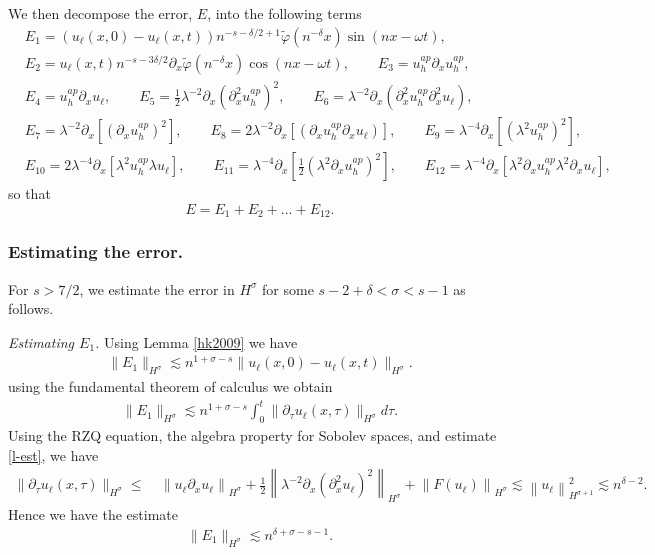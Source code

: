 \documentclass[reqno]{amsart}
\theoremstyle{plain}
\numberwithin{equation}{section}
\begin{document}
We then decompose the error, $E$, into the following terms  
\begin{align*}
 &E_1 = (u_\ell(x,0) - u_\ell(x,t) ) n^{-s-\delta/2 +1 } \widetilde \varphi(n^{-\delta } x) \sin(nx-\omega t)   ,
\\
  &E_2 = u_\ell(x,t) n^{-s-3\delta/2}  \partial_x \widetilde \varphi (n^{-\delta }x) \cos(nx-\omega t)  ,
 \quad \quad E_3 =  u_h^{ap} \partial_x  u_h^{ap}   ,
  \\
 & 
 E_4 = u_h^{ap} \partial_x u_\ell  ,
\quad \quad 
E_5 =  \frac12 \lambda^{-2} \partial_x ( \partial_x ^2 u_h^{ap} )^2 ,
 \quad \quad  
 E_6 =  \lambda^{-2} \partial_x ( \partial_x ^2 u_h^{ap} \partial_x ^2 u_\ell ) ,
\\ &
E_7 = \lambda^{-2}  \partial_x \left [(\partial_x u_h ^{ap}  )^2   \right ] ,
\quad \quad  
E_8 = 2 \lambda^{-2}  \partial_x \left [(\partial_x u_h ^{ap} \partial_x u_\ell )    \right ]  ,
\quad \quad   E_9 =   \lambda^{-4} \partial_x \left [  ( \lambda ^2   u_h ^{ap}  )^2    \right ] ,
\\ & 
E_{10}=  2 \lambda^{-4} \partial_x \left [  \lambda  ^2  u_h ^{ap}   \lambda    u_\ell   \right ]  ,
\quad \quad E_{11} = \lambda^{-4} \partial_x  \left [  \frac12  \left (\lambda^2  \partial_ x u_h^{ap}   \right)^2  \right ]  ,
\quad \quad E_{12} = \lambda^{-4} \partial_x  \left [    \lambda ^2 \partial_ x u_h^{ap}  \lambda ^2\partial_ x u_\ell     \right ]  ,
\end{align*}
 so that $$
 E = E_1+E_2+\dots + E_{12} . 
 $$
 
 \subsubsection{Estimating the error.} For $s>7/2$, we estimate the error in $H^\sigma$ for some $s-2+\delta <\sigma < s-1$ as follows. 
 
 {\em Estimating $E_1$.} Using Lemma \ref{hk2009} we have 
 \begin{align}
 \| E_1 \|_{H^\sigma} \lesssim  n^{1+\sigma - s} \| u_\ell(x,0) - u_\ell(x,t)\|_{H^\sigma} .
 \end{align}
 using the fundamental theorem of calculus we obtain 
 \begin{align}
 \| E_1 \|_{H^\sigma} \lesssim  n^{1+\sigma - s} \int_0^t \| \partial_\tau u_\ell(x,\tau)  \|_{H^\sigma} d\tau.
 \end{align}
 Using the RZQ equation, the algebra property for Sobolev spaces, and estimate \eqref{l-est}, we have 
 \begin{align}
  \| \partial_\tau u_\ell(x,\tau)  \|_{H^\sigma} \le & \
\left \| u_{ \ell} \partial_x u_{  \ell}\right\|_{H^\sigma}  + \frac12\left \| \lambda^{-2} \partial_x ( \partial_x ^2 u_{  \ell})^2 \right\|_{H^\sigma}
+\left \|  F(u_{\ell}) \right\|_{H^\sigma}
 \lesssim  \left  \| u_{ \ell}\right\|_{H^{\sigma+1}} ^2 \lesssim n^{\delta-2} .
 \end{align}
 Hence we have the estimate 
  \begin{align}
 \| E_1 \|_{H^\sigma} \lesssim  n^{\delta+\sigma - s-1}  .
 \end{align}
 
\end{document}
